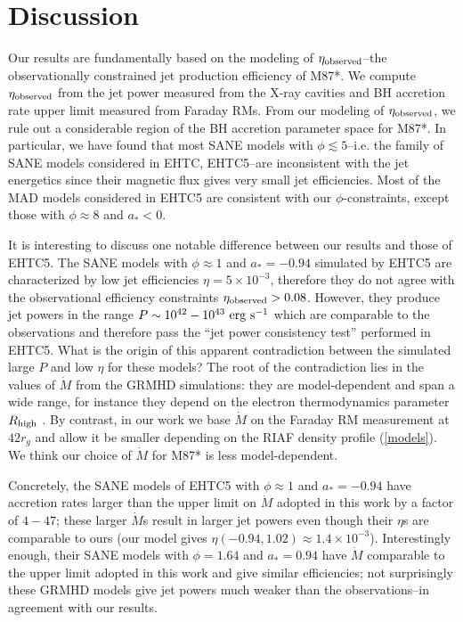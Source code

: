 \documentclass[twocolumn, linenumbers]{aastex62} %
\begin{document}
\section{Discussion} \label{sec:disc}

Our results are fundamentally based on the modeling of $\eta_{\rm observed}$--the observationally constrained jet production efficiency of M87*. We compute $\eta_{\rm observed}$ from the jet power measured from the X-ray cavities and BH accretion rate upper limit measured from Faraday RMs. From our modeling of $\eta_{\rm observed}$, we rule out a considerable region of the BH accretion parameter space for M87*. In particular, we have found that most SANE models with $\phi \lesssim 5$--i.e. the family of SANE models considered in EHTC, EHTC5--are inconsistent with the jet energetics since their magnetic flux gives very small jet efficiencies. Most of the MAD models considered in EHTC5 are consistent with our $\phi$-constraints, except those with $\phi \approx 8$ and $a_*<0$.

It is interesting to discuss one notable difference between our results and those of EHTC5. The SANE models with $\phi \approx 1$ and $a_*=-0.94$ simulated by EHTC5 are characterized by low jet efficiencies $\eta = 5 \times 10^{-3}$, therefore they do not agree with the observational efficiency constraints $\eta_{\rm observed} > 0.08$. However, they produce jet powers in the range $P \sim 10^{42}-10^{43} \ {\rm erg \ s}^{-1}$ which are comparable to the observations and therefore pass the ``jet power consistency test'' performed in EHTC5. What is the origin of this apparent contradiction between the simulated large $P$ and low $\eta$ for these models? 
The root of the contradiction lies in the values of $\dot{M}$ from the GRMHD simulations: they are model-dependent and span a wide range, for instance  they depend on the electron thermodynamics parameter $R_{\rm high}$ \citep{Moscibrodzka2016}. By contrast, in our work we base $\dot{M}$ on the Faraday RM measurement at $42 r_g$ \citep{Kuo2014} and allow it be smaller depending on the RIAF density profile (\textsection \ref{models}). We think our choice of $\dot{M}$ for M87* is less model-dependent. 

Concretely, the SANE models of EHTC5 with $\phi \approx 1$ and $a_*=-0.94$ have accretion rates larger than the upper limit on $\dot{M}$ adopted in this work by a factor of $4-47$; these larger $\dot{M}$s result in larger jet powers even though their $\eta$s are comparable to ours (our model gives $\eta(-0.94, 1.02) \approx  1.4 \times 10^{-3}$). Interestingly enough, their SANE models with $\phi = 1.64$ and $a_*=0.94$ have $\dot{M}$ comparable to the upper limit adopted in this work and give similar efficiencies; not surprisingly these GRMHD models give jet powers much weaker than the observations--in agreement with our results.
\end{document}
